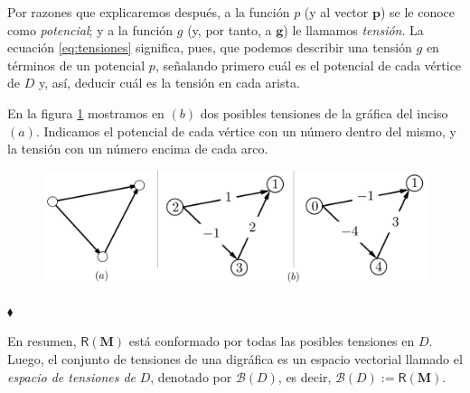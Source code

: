 Por razones que explicaremos después, a la función $p$ (y  al vector $\mathbf{p}$) se le conoce como \textit{potencial};  y a la función $g$ (y, por tanto, a $\mathbf{g}$) le llamamos \textit{tensión}.  La ecuación \ref{eq:tensiones} significa, pues, que podemos describir una tensión $g$ en términos de un potencial $p$, señalando primero cuál es el potencial de cada vértice de $D$ y, así, deducir cuál es la tensión en cada arista. 

\begin{ejem}
En la figura \ref{fig:tensiones} mostramos en $(b)$ dos posibles tensiones de la gráfica del inciso $(a)$. Indicamos el potencial de cada vértice con un número dentro del mismo, y la tensión con un número encima de cada arco. 

\begin{figure}[H]
    \centering
    \includegraphics[scale=0.2]{img/imgchapter2/tensiones.jpg}
    \caption{}
    \label{fig:tensiones}
\end{figure}
\hfill $\blacklozenge$
\end{ejem}

En resumen, $\mathsf{R}(\mathbf{M})$ está conformado por todas las posibles tensiones en $D$. Luego, el conjunto de tensiones de una digráfica es un espacio vectorial llamado el \textit{espacio de tensiones de} $D$, denotado por $\mathcal{B}(D)$, es decir, $\mathcal{B}(D):=\mathsf{R}(\mathbf{M})$. 

